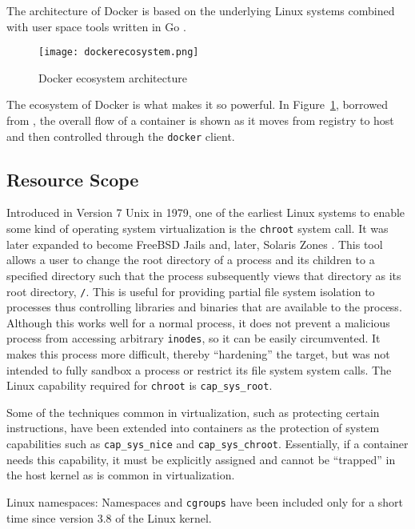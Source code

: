 The architecture of Docker is based on the underlying Linux systems combined with user space tools written in Go \autocite{dockerarch1}. 
\begin{figure}
    \centering
    \texttt{[image: dockerecosystem.png]}
    \caption{Docker ecosystem architecture}
    \label{fig:dockerecosystem}
\end{figure}
The ecosystem of Docker is what makes it so powerful.  
In Figure~\ref{fig:dockerecosystem}, borrowed from \autocite{dockerarch1}, the overall flow of a container is shown as it moves from registry to host and then controlled through the \texttt{docker} client.  


\subsection{Resource Scope}
\label{sec:resource_scope}

Introduced in Version 7 Unix in 1979, one of the earliest Linux systems to enable some kind of operating system virtualization is the \texttt{chroot} system call.
It was later expanded to become FreeBSD Jails and, later, Solaris Zones \autocite{_zones_1}.  
This tool allows a user to change the root directory of a process and its children to a specified directory such that the process subsequently views that directory as its root directory, \texttt{/}.  
This is useful for providing partial file system isolation to processes thus controlling libraries and binaries that are available to the process.
Although this works well for a normal process, it does not prevent a malicious process from accessing arbitrary \texttt{inodes}, so it can be easily circumvented.
It makes this process more difficult, thereby ``hardening'' the target, but was not intended to fully sandbox a process or restrict its file system system calls.
The Linux capability required for \texttt{chroot} is \texttt{cap\_sys\_root}. 

Some of the techniques common in virtualization, such as protecting certain instructions, have been extended into containers as the protection of system capabilities such as \texttt{cap\_sys\_nice} and \texttt{cap\_sys\_chroot}.  
Essentially, if a container needs this capability, it must be explicitly assigned and cannot be ``trapped'' in the host kernel as is common in virtualization.

Linux namespaces: Namespaces and \texttt{cgroups} have been included only for a short time since version 3.8 of the Linux kernel.  

